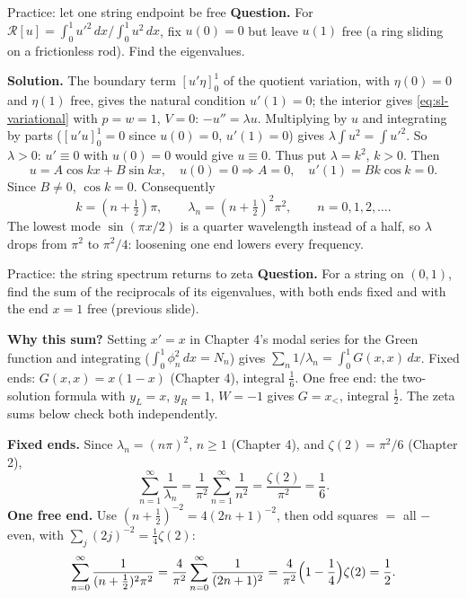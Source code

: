 \documentclass[11pt]{beamer}
\newcommand{\dd}{\,d}
\newcommand{\R}{\mathcal R}
\begin{document}
\begin{frame}{Practice: let one string endpoint be free}
\small
\textbf{Question.} For $\R[u]=\int_0^1u'^2\dd x/\int_0^1u^2\dd x$,
fix $u(0)=0$ but leave $u(1)$ free (a ring sliding on a frictionless rod). Find the eigenvalues.

\medskip
\textbf{Solution.} The boundary term $[u'\eta]_0^1$ of the quotient variation, with $\eta(0)=0$
and $\eta(1)$ free, gives the natural condition $u'(1)=0$; the interior gives
\eqref{eq:sl-variational} with $p=w=1$, $V=0$: $-u''=\lambda u$.
Multiplying by $u$ and integrating by parts ($[u'u]_0^1=0$ since $u(0)=0$, $u'(1)=0$)
gives $\lambda\int u^2=\int u'^2$. So $\lambda>0$: $u'\equiv0$ with $u(0)=0$ would give $u\equiv0$.
Thus put $\lambda=k^2$, $k>0$. Then
\[
 u=A\cos kx+B\sin kx,\quad u(0)=0\Rightarrow A=0,
 \quad u'(1)=Bk\cos k=0.
\]
Since $B\ne0$, $\cos k=0$. Consequently
\[
 k=(n+\tfrac12)\pi,\qquad
 \lambda_n=(n+\tfrac12)^2\pi^2,\qquad n=0,1,2,\ldots .
\]
The lowest mode $\sin(\pi x/2)$ is a quarter wavelength instead of a half, so $\lambda$ drops
from $\pi^2$ to $\pi^2/4$: loosening one end lowers every frequency.
\end{frame}

\begin{frame}{Practice: the string spectrum returns to zeta}
\small
\textbf{Question.} For a string on $(0,1)$, find the sum of the reciprocals of its
eigenvalues, with both ends fixed and with the end $x=1$ free (previous slide).

\medskip
\textbf{Why this sum?} Setting $x'=x$ in Chapter 4's modal series for the Green function
and integrating ($\int_0^1\phi_n^2\dd x=N_n$) gives $\sum_n1/\lambda_n=\int_0^1G(x,x)\dd x$.
Fixed ends: $G(x,x)=x(1-x)$ (Chapter 4), integral $\frac16$. One free end: the two-solution
formula with $y_L=x$, $y_R=1$, $W=-1$ gives $G=x_<$, integral $\frac12$.
The zeta sums below check both independently.

\medskip
\textbf{Fixed ends.} Since $\lambda_n=(n\pi)^2$, $n\ge1$ (Chapter 4), and $\zeta(2)=\pi^2/6$ (Chapter 2),
\[
 \sum_{n=1}^\infty\frac1{\lambda_n}
 =\frac1{\pi^2}\sum_{n=1}^\infty\frac1{n^2}
 =\frac{\zeta(2)}{\pi^2}=\frac16.
\]
\textbf{One free end.} Use $(n+\tfrac12)^{-2}=4(2n+1)^{-2}$, then odd squares $=$ all $-$ even,
with $\sum_j(2j)^{-2}=\frac14\zeta(2)$:
\[
 \sum_{n=0}^\infty\frac1{(n+\tfrac12)^2\pi^2}
 =\frac4{\pi^2}\sum_{n=0}^\infty\frac1{(2n+1)^2}
 =\frac4{\pi^2}\Bigl(1-\frac14\Bigr)\zeta(2)=\frac12.
\]
\end{frame}
\end{document}
